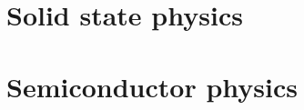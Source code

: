 \chapter{Solid state physics}
\label{Solid state physics}

\chapter{Semiconductor physics}
\label{Semiconductor physics}